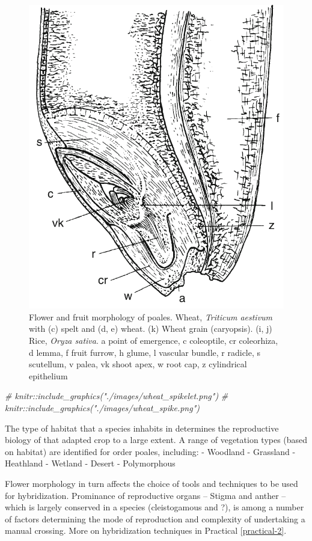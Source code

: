 \documentclass[]{book}
\newenvironment{Shaded}{\begin{snugshade}}{\end{snugshade}}
\newcommand{\CommentTok}[1]{\textcolor[rgb]{0.56,0.35,0.01}{\textit{#1}}}
\begin{document}
\begin{figure}

{\centering \includegraphics[width=0.55\linewidth]{./images/wheat_kernel} 

}

\caption{Flower and fruit morphology of poales. Wheat, \textit{Triticum aestivum} with (c) spelt and (d, e) wheat. (k) Wheat grain (caryopsis). (i, j) Rice, \textit{Oryza sativa}. a point of emergence, c coleoptile, cr coleorhiza, d lemma, f fruit furrow, h glume, l vascular bundle, r radicle, s scutellum, v palea, vk shoot apex, w root cap, z cylindrical epithelium}\label{fig:floral-morphology-poales}
\end{figure}

\begin{Shaded}
\begin{Highlighting}[]
\CommentTok{# knitr::include_graphics("./images/wheat_spikelet.png")}
\CommentTok{# knitr::include_graphics("./images/wheat_spike.png")}
\end{Highlighting}
\end{Shaded}

The type of habitat that a species inhabits in determines the reproductive biology of that adapted crop to a large extent. A range of vegetation types (based on habitat) are identified for order poales, including:
- Woodland
- Grassland
- Heathland
- Wetland
- Desert
- Polymorphous

Flower morphology in turn affects the choice of tools and techniques to be used for hybridization. Prominance of reproductive organs -- Stigma and anther -- which is largely conserved in a species (cleistogamous and ?), is among a number of factors determining the mode of reproduction and complexity of undertaking a manual crossing. More on hybridization techniques in Practical \ref{practical-2}.
\end{document}
